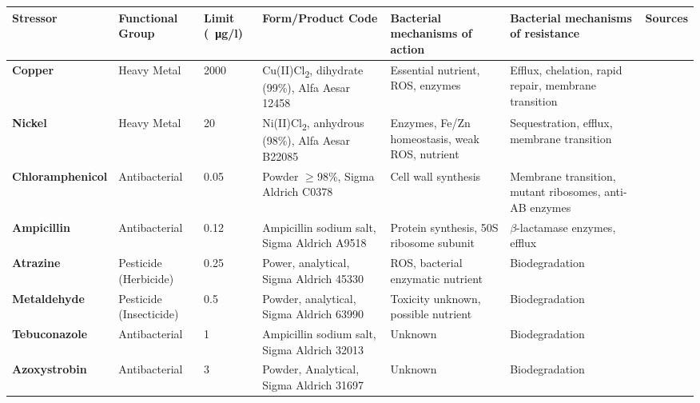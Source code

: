 \documentclass[final,1p,times]{elsarticle}
\begin{document}
\begin{landscape}
\begin{table}[ht]
\begin{threeparttable}
\small
\setlength{\tabcolsep}{4pt}
\setlength{\extrarowheight}{3pt}
\begin{tabular}{l M l M L L c}
\toprule
\textbf{Stressor} & \textbf{Functional Group} & \textbf{Limit (\SI{}{\ug}/l}) & \textbf{Form/Product Code} & \textbf{Bacterial mechanisms of action} & \textbf{Bacterial mechanisms of resistance} & \textbf{Sources} \\
\midrule
{}\textbf{Copper} & Heavy Metal & 2000 & Cu(II)Cl\textsubscript{2}, dihydrate (99\%), Alfa Aesar 12458 & Essential nutrient, ROS, enzymes & Efflux, chelation, rapid repair, membrane transition & \cite{Nayar2004EnvironmentalMesocosms,Valko2005,Dupont2011,ECHA2018Cu} \\
\textbf{Nickel} & Heavy Metal & 20 & Ni(II)Cl\textsubscript{2}, anhydrous (98\%), Alfa Aesar B22085 & Enzymes, Fe/Zn homeostasis, weak ROS, nutrient & Sequestration, efflux, membrane transition & \cite{Nayar2004EnvironmentalMesocosms,Macomber2011,Nishimura1998,Zamble2015} \\
\textbf{Chloramphenicol} & Antibacterial & 0.05 & Powder $\geqslant$98\%, Sigma Aldrich C0378 & Cell wall synthesis & Membrane transition, mutant ribosomes, anti-AB enzymes & \cite{Shaw1979,Rebstock1949,Toku-E2018Ch,Ruiz1999MechanismsFish} \\
\textbf{Ampicillin} & Antibacterial & 0.12 & Ampicillin sodium salt, Sigma Aldrich A9518 & Protein synthesis, 50S ribosome subunit & $\beta$-lactamase enzymes, efflux & \cite{Ruiz1999MechanismsFish,Costanzo2005} \\
\textbf{Atrazine} & Pesticide (Herbicide) & 0.25 & Power, analytical, Sigma Aldrich 45330 & ROS, bacterial enzymatic nutrient & Biodegradation & \cite{Shimabukuro1969,Delorenzo2001,Zhang2012} \\
\textbf{Metaldehyde} & Pesticide \break (Insecticide) & 0.5 & Powder, analytical, Sigma Aldrich 63990 & Toxicity unknown, possible nutrient & Biodegradation & \cite{Kay2014,Castle2017,Thomas2017} \\
\textbf{Tebuconazole} & Antibacterial & 1 & Ampicillin sodium salt, Sigma Aldrich 32013 & Unknown & Biodegradation & \cite{Sehnem2010,Artigas2014ComparativeEcosystems} \\
\textbf{Azoxystrobin} & Antibacterial & 3 & Powder, Analytical, Sigma Aldrich 31697 & Unknown & Biodegradation & \cite{Battaglin2011Occurrence20052006,Rodrigues2013,Loos2010,Bacmaga2015MicrobialAzoxystrobin} \\

\end{tabular}
\end{threeparttable}
\end{table}
\end{landscape}
\end{document}
